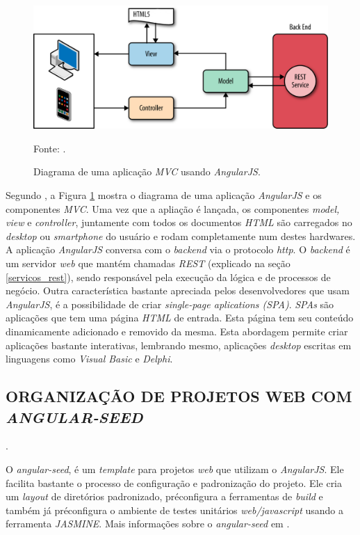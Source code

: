 \begin{figure}[ht]
	\centering
	\includegraphics[width=14cm]{figuras/angulajs_mvc.eps}
	\caption{Diagrama de uma aplicação \emph{MVC} usando \emph{AngularJS}.}
	\label{angularjs_mvc}
	\footnotesize Fonte:
	\cite{Williamson2015}.
\end{figure}
Segundo \cite{Williamson2015}, a Figura \ref{angularjs_mvc} mostra o diagrama de uma aplicação \emph{AngularJS} e os componentes \emph{MVC}.  Uma vez que a apliação é lançada, os componentes \emph{model, view} e \emph{controller}, juntamente com todos os documentos \emph{HTML} são carregados no \emph{desktop} ou \emph{smartphone} do usuário e rodam completamente num destes hardwares.  A aplicação \emph{AngularJS} conversa com o \emph{backend} via o protocolo \emph{http}.  O \emph{backend} é um servidor \emph{web} que mantém chamadas \emph{REST} (explicado na seção \ref{servicos_rest}), sendo responsável pela execução da lógica e de processos de negócio.  
Outra característica bastante apreciada pelos desenvolvedores que usam \emph{AngularJS}, é a possibilidade de criar \emph{single-page aplications (SPA)}. 
\emph{SPAs} são aplicações que tem uma página \emph{HTML} de entrada. 
Esta página tem seu conteúdo dinamicamente adicionado e removido da mesma.
Esta abordagem permite criar aplicações bastante interativas, lembrando mesmo, aplicações \emph{desktop} escritas em linguagens como \emph{Visual Basic} e \emph{Delphi}.

\subsection{ORGANIZAÇÃO DE PROJETOS WEB COM \emph{ANGULAR-SEED}}.
\label{angular_seed}

O \emph{angular-seed}, é um \emph{template} para projetos \emph{web} que utilizam o \emph{AngularJS}. 
Ele facilita bastante o processo de configuração e padronização do projeto. 
Ele cria um \emph{layout} de diretórios padronizado, préconfigura a ferramentas de \emph{build} e também já préconfigura o ambiente de testes unitários \emph{web/javascript} usando a ferramenta \emph{JASMINE}. 
Mais informações sobre o \emph{angular-seed} em \cite{Google2015b}.

